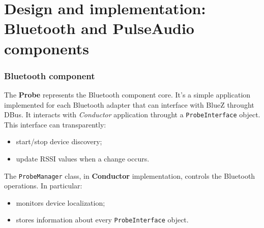 \documentclass{beamer}
\begin{document}

\section[Design and implementation]{Design and implementation: Bluetooth and PulseAudio components}

\begin{frame}
\frametitle{Bluetooth component}
The \textbf{Probe} represents the Bluetooth component core. It's a simple application implemented for each Bluetooth adapter that can interface with BlueZ throught DBus. It interacts with \textsl{Conductor} application throught a \texttt{ProbeInterface} object.\\ This interface can transparently:
\begin{itemize}
	\item start/stop device discovery;
	\item update RSSI values when a change occurs.
\end{itemize}
The \texttt{ProbeManager} class, in \textbf{Conductor} implementation, controls the Bluetooth operations. In particular:
\begin{itemize}
	\item monitors device localization;
	\item stores information about every \texttt{ProbeInterface} object.
\end{itemize}
\end{frame}
\end{document}
